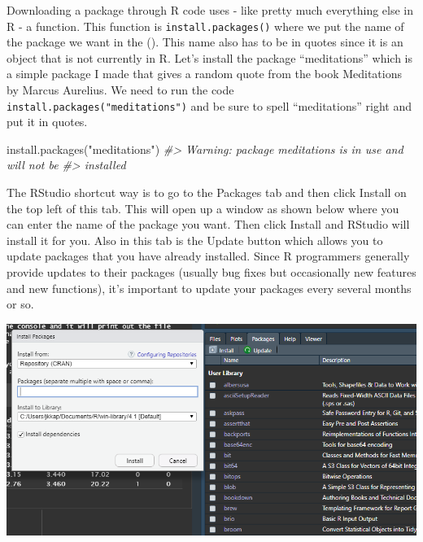 \documentclass[
]{krantz}
\makeatletter
\newenvironment{Shaded}{\begin{snugshade}}{\end{snugshade}}
\newcommand{\CommentTok}[1]{\textcolor[rgb]{0.37,0.37,0.37}{\textit{#1}}}
\newcommand{\FunctionTok}[1]{\textcolor[rgb]{0,0,0}{#1}}
\newcommand{\NormalTok}[1]{#1}
\newcommand{\StringTok}[1]{\textcolor[rgb]{0.5,0.5,0.5}{#1}}
\newenvironment{kframe}{%
\medskip{}
\setlength{\fboxsep}{.8em}
 \def\at@end@of@kframe{}%
 \ifinner\ifhmode%
  \def\at@end@of@kframe{\end{minipage}}%
  \begin{minipage}{\columnwidth}%
 \fi\fi%
 \def\FrameCommand##1{\hskip\@totalleftmargin \hskip-\fboxsep
 \colorbox{shadecolor}{##1}\hskip-\fboxsep
     \hskip-\linewidth \hskip-\@totalleftmargin \hskip\columnwidth}%
 \MakeFramed {\advance\hsize-\width
   \@totalleftmargin\z@ \linewidth\hsize
   \@setminipage}}%
 {\par\unskip\endMakeFramed%
 \at@end@of@kframe}
\renewenvironment{Shaded}{\begin{kframe}}{\end{kframe}}
\makeatother
\begin{document}
Downloading a package through R code uses - like pretty much everything else in R - a function. This function is \texttt{install.packages()} where we put the name of the package we want in the (). This name also has to be in quotes since it is an object that is not currently in R. Let's install the package ``meditations'' which is a simple package I made that gives a random quote from the book Meditations by Marcus Aurelius. We need to run the code \texttt{install.packages("meditations")} and be sure to spell ``meditations'' right and put it in quotes.

\begin{Shaded}
\begin{Highlighting}[]
\FunctionTok{install.packages}\NormalTok{(}\StringTok{"meditations"}\NormalTok{)}
\CommentTok{\#\textgreater{} Warning: package \textquotesingle{}meditations\textquotesingle{} is in use and will not be}
\CommentTok{\#\textgreater{} installed}
\end{Highlighting}
\end{Shaded}

The RStudio shortcut way is to go to the Packages tab and then click Install on the top left of this tab. This will open up a window as shown below where you can enter the name of the package you want. Then click Install and RStudio will install it for you. Also in this tab is the Update button which allows you to update packages that you have already installed. Since R programmers generally provide updates to their packages (usually bug fixes but occasionally new features and new functions), it's important to update your packages every several months or so.

\includegraphics{images/install_packages.PNG}
\end{document}
